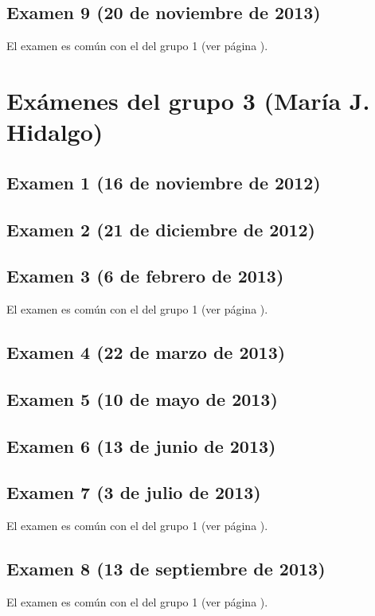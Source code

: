 \documentclass[a4paper,12pt,twoside]{book}
\begin{document}
\subsection{Examen 9 (20 de noviembre de 2013)}
El examen es común con el del grupo 1 (ver página \pageref{examen_12_13_2_9}).

\section{Exámenes del grupo 3 (María J. Hidalgo)}
\subsection{Examen 1 (16 de noviembre de 2012)}
\subsection{Examen 2 (21 de diciembre de 2012)}
\subsection{Examen 3 (6 de febrero de 2013)}
El examen es común con el del grupo 1 (ver página \pageref{examen_12_13_2_3}).
\subsection{Examen 4 (22 de marzo de 2013)}
\subsection{Examen 5 (10 de mayo de 2013)}
\subsection{Examen 6 (13 de junio de 2013)}
\subsection{Examen 7 (3 de julio de 2013)}
El examen es común con el del grupo 1 (ver página \pageref{examen_12_13_2_7}).
\subsection{Examen 8 (13 de septiembre de 2013)}
El examen es común con el del grupo 1 (ver página \pageref{examen_12_13_2_8}).
\end{document}
